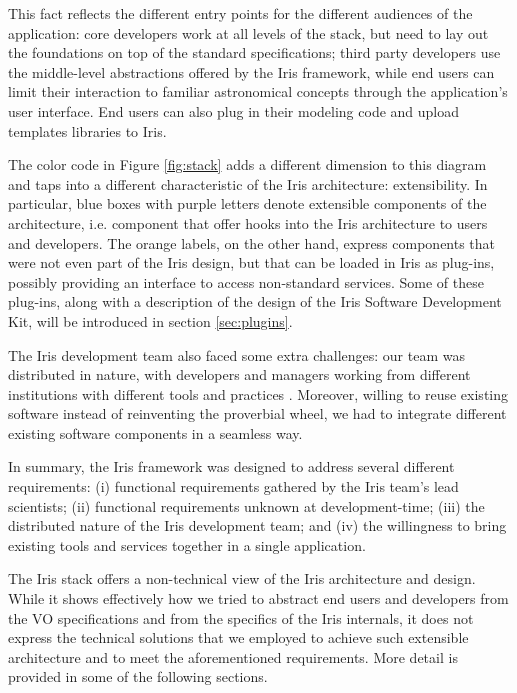 \documentclass[final,5p]{elsarticle}
\begin{document}
This fact reflects the different entry points for the different audiences of the application: core developers work at all levels of the stack, but need to lay out the foundations on top of the standard specifications; third party developers use the middle-level abstractions offered by the Iris framework, while end users can limit their interaction to familiar astronomical concepts through the application's user interface. End users can also plug in their modeling code and upload templates libraries to Iris.

The color code in Figure \ref{fig:stack} adds a different dimension to this diagram and taps into a different characteristic of the Iris architecture: extensibility. In particular, blue boxes with purple letters denote extensible components of the architecture, i.e. component that offer hooks into the Iris architecture to users and developers. The orange labels, on the other hand, express components that were not even part of the Iris design, but that can be loaded in Iris as plug-ins, possibly providing an interface to access non-standard services. Some of these plug-ins, along with a description of the design of the Iris Software Development Kit, will be introduced in section \ref{sec:plugins}.

The Iris development team also faced some extra challenges: our team was distributed in nature, with developers and managers working from different institutions with different tools and practices \citep{2012SPIE.8449E..0IE}. Moreover, willing to reuse existing software instead of reinventing the proverbial wheel, we had to integrate different existing software components in a seamless way.

In summary, the Iris framework was designed to address several different requirements: (i) functional requirements gathered by the Iris team's lead scientists; (ii) functional requirements unknown at development-time; (iii) the distributed nature of the Iris development team; and (iv) the willingness to bring existing tools and services together in a single application.

The Iris stack offers a non-technical view of the Iris architecture and design. While it shows effectively how we tried to abstract end users and developers from the VO specifications and from the specifics of the Iris internals, it does not express the technical solutions that we employed to achieve such extensible architecture and to meet the aforementioned requirements. More detail is provided in some of the following sections.
\end{document}
